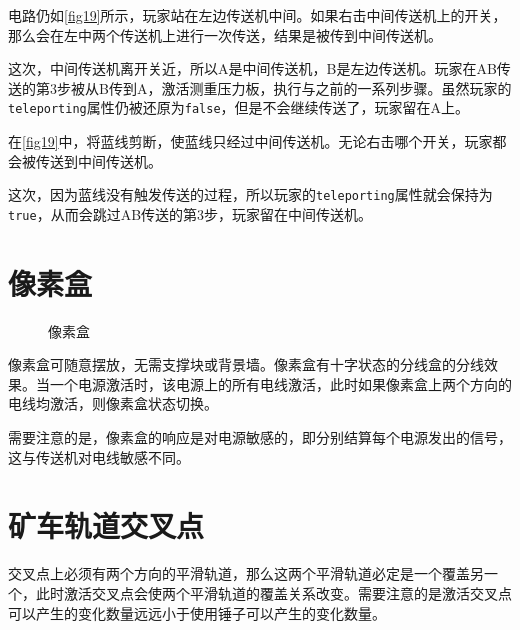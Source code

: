 \begin{example}{}{}
电路仍如\autoref{fig19}所示，玩家站在左边传送机中间。如果右击中间传送机上的开关，那么会在左中两个传送机上进行一次传送，结果是被传到中间传送机。

这次，中间传送机离开关近，所以A是中间传送机，B是左边传送机。玩家在AB传送的第3步被从B传到A，激活测重压力板，执行与之前的一系列步骤。虽然玩家的\lstinline{teleporting}属性仍被还原为\lstinline{false}，但是不会继续传送了，玩家留在A上。
\end{example}

\begin{example}{}{}
在\autoref{fig19}中，将蓝线剪断，使蓝线只经过中间传送机。无论右击哪个开关，玩家都会被传送到中间传送机。

这次，因为蓝线没有触发传送的过程，所以玩家的\lstinline{teleporting}属性就会保持为\lstinline{true}，从而会跳过AB传送的第3步，玩家留在中间传送机。
\end{example}

\section{像素盒}\label{sec21}
\begin{figure}[!ht]
\centering
{}
\caption{像素盒}
\end{figure}
像素盒可随意摆放，无需支撑块或背景墙。像素盒有十字状态的分线盒的分线效果。当一个电源激活时，该电源上的所有电线激活，此时如果像素盒上两个方向的电线均激活，则像素盒状态切换。

需要注意的是，像素盒的响应是对电源敏感的，即分别结算每个电源发出的信号，这与传送机对电线敏感不同。

\section{矿车轨道交叉点}
交叉点上必须有两个方向的平滑轨道，那么这两个平滑轨道必定是一个覆盖另一个，此时激活交叉点会使两个平滑轨道的覆盖关系改变。需要注意的是激活交叉点可以产生的变化数量远远小于使用锤子可以产生的变化数量。

